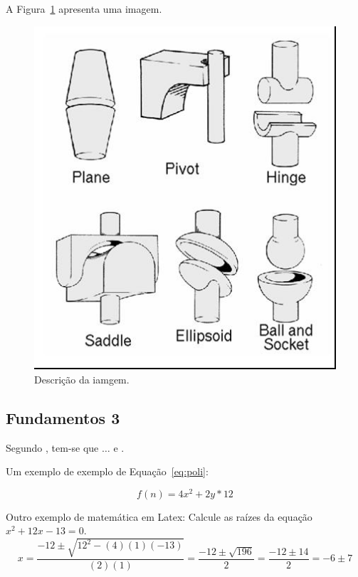 
A Figura~\ref{fig_grafico} apresenta uma imagem.

\begin{figure}[h!]    
	\begin{center}
	    \includegraphics[scale=0.5]{imagens/fig2.jpg}
	\end{center}
    \caption{\label{fig_grafico}Descrição da iamgem.}
\end{figure}

\subsection{Fundamentos 3}
\label{sec:fundamentos3}


Segundo , tem-se que $\dots$ \cite{boulic:91} e \cite{smith:99}.


Um exemplo de exemplo de Equação~\ref{eq:poli}:

\begin{equation}
\label{eq:poli}
    f(n) = 4x^2 + 2y*12
\end{equation}

Outro exemplo de matemática em Latex: Calcule as raízes da equação $x^2 + 12x - 13 = 0$.
\begin{equation}
 x = \frac{-12 \pm \sqrt{12^2 - (4)(1)(-13)}}{(2)(1)} = \frac{-12 \pm \sqrt{196}}{2} = \frac{-12 \pm 14}{2} = -6 \pm 7
\end{equation}
